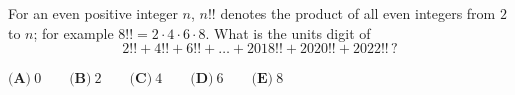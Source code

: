 For an even positive integer $n$, $n!!$ denotes the product of all even integers from $2$ to $n$; for example $8!!=2\cdot4\cdot6\cdot8$. What is the units digit of
\[2!!+4!!+6!!+\dots+2018!!+2020!!+2022!!\,?\]

$\textbf{(A)}\ 0\qquad\textbf{(B)}\ 2\qquad\textbf{(C)}\ 4\qquad\textbf{(D)}\ 6\qquad\textbf{(E)}\ 8$
